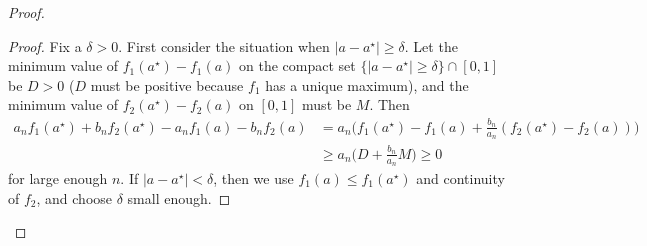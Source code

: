 \documentclass[bj,authoryear,noshowframe]{imsart}
\numberwithin{equation}{section}
\theoremstyle{plain}
\theoremstyle{definition}
\begin{document}
\begin{proof}
\begin{proof} 
Fix a $\delta>0$. First consider the situation when $|a-a^\star|\geq \delta$. Let the minimum value of $f_1(a^\star) - f_1(a)$ on the compact set $\{|a-a^\star|\geq \delta\} \cap [0,1]$ be $D>0$ ($D$ must be positive because $f_1$ has a unique maximum), and the minimum value of $f_2(a^\star) - f_2(a)$ on $[0,1]$ must be $M$. Then
	\begin{equation}
	\begin{aligned}
 	a_nf_1(a^\star)+b_nf_2(a^\star) - a_nf_1(a)-b_nf_2(a) 
 	&= a_n\Big(f_1(a^\star) - f_1(a) + \frac{b_n}{a_n}(f_2(a^\star) - f_2(a))\Big)\\
 	&\geq a_n\Big(D + \frac{b_n}{a_n}M\Big) \geq 0
	\end{aligned}
	\end{equation}
for large enough $n$. If $|a-a^\star|< \delta$, then we use $f_1(a) \leq f_1(a^\star)$ and continuity of $f_2$, and choose $\delta$ small enough. 
\end{proof}


\end{proof}
\end{document}
